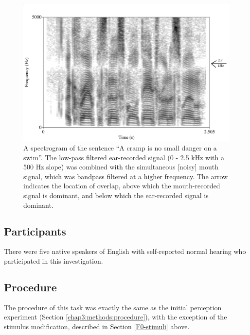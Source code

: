 \begin{figure}[h]
\centering
  \includegraphics[width=\textwidth]{figure/combined-signal_labeled.png}
  \caption{A spectrogram of the sentence ``A cramp is no small danger on a swim''.  The low-pass filtered ear-recorded signal (0 - 2.5 kHz with a 500 Hz slope) was combined with the simultaneous [noisy] mouth signal, which was bandpass filtered at a higher frequency.  The arrow indicates the location of overlap, above which the mouth-recorded signal is dominant, and below which the ear-recorded signal is dominant.}
  \label{fig:combined-signal}
\end{figure}
%

\subsection{Participants}
There were five native speakers of English with self-reported normal hearing who participated in this investigation.  

\subsection{Procedure}
The procedure of this task was exactly the same as the initial perception experiment (Section \ref{chap3:methods:procedure}), with the exception of the stimulus modification, described in Section \ref{F0-stimuli} above.




